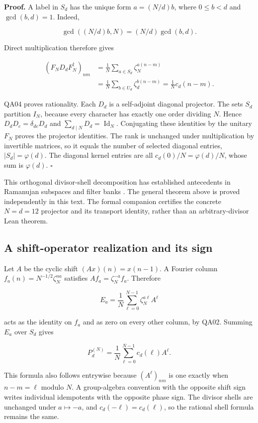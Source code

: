 \textbf{Proof.} A label in \(S_d\) has the unique form \(a=(N/d)b\),
where \(0\le b<d\) and \(\gcd(b,d)=1\). Indeed,

\[
\gcd((N/d)b,N)=(N/d)\gcd(b,d).
\]

Direct multiplication therefore gives

\[
\begin{aligned}
(F_ND_dF_N^\dagger)_{nm}
&=\frac1N\sum_{a\in S_d}\zeta_N^{a(n-m)}\\
&=\frac1N\sum_{b\in U_d}\zeta_d^{b(n-m)}
=\frac1N c_d(n-m).
\end{aligned}
\]

QA04 proves rationality. Each \(D_d\) is a self-adjoint diagonal
projector. The sets \(S_d\) partition \(I_N\), because every character
has exactly one order dividing \(N\). Hence \(D_dD_e=\delta_{de}D_d\)
and \(\sum_{d\mid N}D_d=\operatorname{Id}_N\). Conjugating these identities by the
unitary \(F_N\) proves the projector identities. The rank is unchanged
under multiplication by invertible matrices, so it equals the number of
selected diagonal entries, \(|S_d|=\varphi(d)\). The diagonal kernel
entries are all \(c_d(0)/N=\varphi(d)/N\), whose sum is \(\varphi(d)\).
\(\square\)

This orthogonal divisor-shell decomposition has established antecedents
in Ramanujan subspaces and filter banks \cite{q:Vaidyanathan2014FIR,q:Vaidyanathan2014I,q:Vaidyanathan2014II}. The general theorem above is
proved independently in this text. The formal companion certifies the
concrete \(N=d=12\) projector and its transport identity, rather than an
arbitrary-divisor Lean theorem.

\hypertarget{q:a-shift-operator-realization-and-its-sign}{%
\subsection{A shift-operator realization and its
sign}\label{q:a-shift-operator-realization-and-its-sign}}

Let \(A\) be the cyclic shift \((Ax)(n)=x(n-1)\). A Fourier column
\(f_a(n)=N^{-1/2}\zeta_N^{na}\) satisfies \(Af_a=\zeta_N^{-a}f_a\).
Therefore

\[
E_a=\frac1N\sum_{\ell=0}^{N-1}\zeta_N^{a\ell}A^\ell
\]

acts as the identity on \(f_a\) and as zero on every other column, by
QA02. Summing \(E_a\) over \(S_d\) gives

\[
P_d^{(N)}=\frac1N\sum_{\ell=0}^{N-1}c_d(\ell)A^\ell.
\]

This formula also follows entrywise because \((A^\ell)_{nm}\) is one
exactly when \(n-m=\ell\) modulo \(N\). A group-algebra convention with
the opposite shift sign writes individual idempotents with the opposite
phase sign. The divisor shells are unchanged under \(a\mapsto -a\), and
\(c_d(-\ell)=c_d(\ell)\), so the rational shell formula remains the
same.

